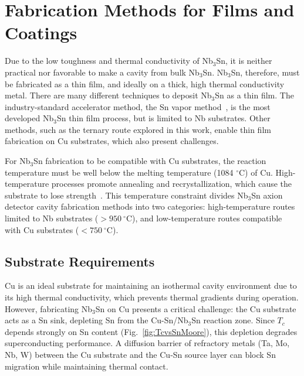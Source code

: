 
    

    
\section{Fabrication Methods for Films and Coatings}\label{sec:coatings}
    
    Due to the low toughness and thermal conductivity of Nb$_3$Sn, it is neither practical nor favorable to make a cavity from bulk Nb$_3$Sn. Nb$_3$Sn, therefore, must be fabricated as a thin film, and ideally on a thick, high thermal conductivity metal. There are many different techniques to deposit Nb$_3$Sn as a thin film. The industry-standard accelerator method, the Sn vapor method~\cite{peinigerNb3SnSUPERCONDUCTINGACCELERATORS1989,posenMeasurementHighQuality2022}, is the most developed Nb$_3$Sn thin film process, but is limited to Nb substrates. Other methods, such as the ternary route explored in this work, enable thin film fabrication on Cu substrates, which also present challenges.

    For Nb$_3$Sn fabrication to be compatible with Cu substrates, the reaction temperature must be well below the melting temperature (1084 $^\circ$C) of Cu. High-temperature processes promote annealing and recrystallization, which cause the substrate to lose strength~\cite{okudaFabricationTestingLband1991}. This temperature constraint divides Nb$_3$Sn axion detector cavity fabrication methods into two categories: high-temperature routes limited to Nb substrates ($>950~^\circ$C), and low-temperature routes compatible with Cu substrates ($<750~^\circ$C). 

    \subsection{Substrate Requirements}

    Cu is an ideal substrate for maintaining an isothermal cavity environment due to its high thermal conductivity, which prevents thermal gradients during operation. However, fabricating Nb$_3$Sn on Cu presents a critical challenge: the Cu substrate acts as a Sn sink, depleting Sn from the Cu-Sn/Nb$_3$Sn reaction zone. Since $T_c$ depends strongly on Sn content (Fig.~\ref{fig:TcvsSnMoore}), this depletion degrades superconducting performance. A diffusion barrier of refractory metals (Ta, Mo, Nb, W) between the Cu substrate and the Cu-Sn source layer can block Sn migration while maintaining thermal contact.
    
